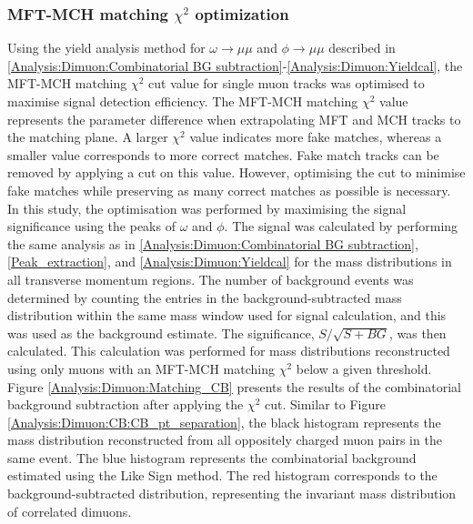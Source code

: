         \subsubsection{MFT-MCH matching $\chi^2$ optimization}
        \label{matching_chi2_opt}
            Using the yield analysis method for $\omega \rightarrow \mu\mu$ and $\phi \rightarrow \mu\mu$ described in \ref{Analysis:Dimuon:Combinatorial BG subtraction}-\ref{Analysis:Dimuon:Yieldcal}, the MFT-MCH matching \(\chi^2\) cut value for single muon tracks was optimised to maximise signal detection efficiency. The MFT-MCH matching \(\chi^2\) value represents the parameter difference when extrapolating MFT and MCH tracks to the matching plane. A larger \(\chi^2\) value indicates more fake matches, whereas a smaller value corresponds to more correct matches. Fake match tracks can be removed by applying a cut on this value. However, optimising the cut to minimise fake matches while preserving as many correct matches as possible is necessary. In this study, the optimisation was performed by maximising the signal significance using the peaks of \(\omega\) and \(\phi\).
            The signal was calculated by performing the same analysis as in \ref{Analysis:Dimuon:Combinatorial BG subtraction}, \ref{Peak_extraction}, and \ref{Analysis:Dimuon:Yieldcal} for the mass distributions in all transverse momentum regions. The number of background events was determined by counting the entries in the background-subtracted mass distribution within the same mass window used for signal calculation, and this was used as the background estimate. The significance, \( S/\sqrt{S+BG} \), was then calculated. This calculation was performed for mass distributions reconstructed using only muons with an MFT-MCH matching \(\chi^2\) below a given threshold.  
            Figure \ref{Analysis:Dimuon:Matching_CB} presents the results of the combinatorial background subtraction after applying the \(\chi^2\) cut. Similar to Figure \ref{Analysis:Dimuon:CB:CB_pt_separation}, the black histogram represents the mass distribution reconstructed from all oppositely charged muon pairs in the same event. The blue histogram represents the combinatorial background estimated using the Like Sign method. The red histogram corresponds to the background-subtracted distribution, representing the invariant mass distribution of correlated dimuons.
